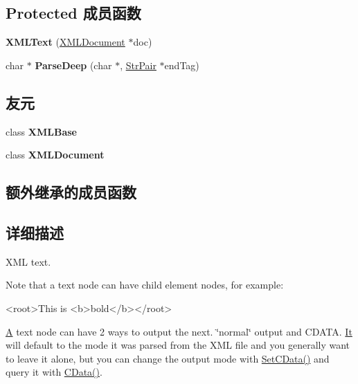 \subsection*{Protected 成员函数}
\begin{DoxyCompactItemize}
\item 
\mbox{\label{classtinyxml2_1_1_x_m_l_text_ad9f46d70e61e5386ead93728d8b90267}} 
{\bfseries X\+M\+L\+Text} (\hyperlink{classtinyxml2_1_1_x_m_l_document}{X\+M\+L\+Document} $\ast$doc)
\item 
\mbox{\label{classtinyxml2_1_1_x_m_l_text_ac18d9eec9f12b827b0d02b0847bf279e}} 
char $\ast$ {\bfseries Parse\+Deep} (char $\ast$, \hyperlink{classtinyxml2_1_1_str_pair}{Str\+Pair} $\ast$end\+Tag)
\end{DoxyCompactItemize}
\subsection*{友元}
\begin{DoxyCompactItemize}
\item 
\mbox{\label{classtinyxml2_1_1_x_m_l_text_a449202cfc89e7ae5c2f81995476f9ec1}} 
class {\bfseries X\+M\+L\+Base}
\item 
\mbox{\label{classtinyxml2_1_1_x_m_l_text_a4eee3bda60c60a30e4e8cd4ea91c4c6e}} 
class {\bfseries X\+M\+L\+Document}
\end{DoxyCompactItemize}
\subsection*{额外继承的成员函数}


\subsection{详细描述}
X\+ML text.

Note that a text node can have child element nodes, for example\+: \begin{DoxyVerb}<root>This is <b>bold</b></root>
\end{DoxyVerb}


\hyperlink{struct_a}{A} text node can have 2 ways to output the next. \char`\"{}normal\char`\"{} output and C\+D\+A\+TA. \hyperlink{class_it}{It} will default to the mode it was parsed from the X\+ML file and you generally want to leave it alone, but you can change the output mode with \hyperlink{classtinyxml2_1_1_x_m_l_text_ad080357d76ab7cc59d7651249949329d}{Set\+C\+Data()} and query it with \hyperlink{classtinyxml2_1_1_x_m_l_text_ac1bb5ea4166c320882d9e0ad16fd385b}{C\+Data()}. 

